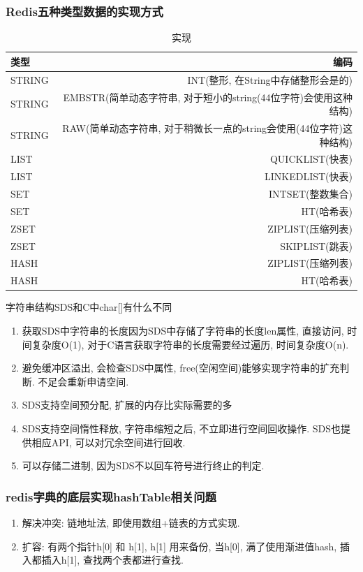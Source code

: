 \documentclass[UTF8]{ctexart}
\begin{document}
\subsubsection{Redis五种类型数据的实现方式}
\begin{table}[!htbp]
	\centering
	\caption{实现}
	\begin{tabular}{|l|r|}
		
		\hline
		类型&编码\\
		\hline
		STRING&INT(整形, 在String中存储整形会是的)\\
		\hline
		STRING&EMBSTR(简单动态字符串, 对于短小的string(44位字符)会使用这种结构)\\
		\hline
		STRING&RAW(简单动态字符串, 对于稍微长一点的string会使用(44位字符)这种结构)\\
		\hline
		LIST&QUICKLIST(快表)\\
		\hline
		LIST&LINKEDLIST(快表)\\
		\hline
		SET&INTSET(整数集合)\\
		\hline
		SET&HT(哈希表)\\
		\hline
		ZSET&ZIPLIST(压缩列表)\\
		\hline
		ZSET&SKIPLIST(跳表)\\
		\hline
		HASH&ZIPLIST(压缩列表)\\
		\hline
		HASH&HT(哈希表)\\
		\hline
	\end{tabular}
\end{table}
字符串结构SDS和C中char[]有什么不同
\begin{enumerate}
	\item 获取SDS中字符串的长度因为SDS中存储了字符串的长度len属性, 直接访问, 时间复杂度O(1), 对于C语言获取字符串的长度需要经过遍历, 时间复杂度O(n).
	\item 避免缓冲区溢出, 会检查SDS中属性, free(空闲空间)能够实现字符串的扩充判断. 不足会重新申请空间.
	\item SDS支持空间预分配, 扩展的内存比实际需要的多
	\item SDS支持空间惰性释放, 字符串缩短之后, 不立即进行空间回收操作. SDS也提供相应API, 可以对冗余空间进行回收.
	\item 可以存储二进制, 因为SDS不以回车符号进行终止的判定.
\end{enumerate}
\subsubsection{redis字典的底层实现hashTable相关问题}
\begin{enumerate}
	\item 解决冲突: 链地址法, 即使用数组+链表的方式实现. 
	\item 扩容: 有两个指针h[0] 和 h[1], h[1] 用来备份, 当h[0], 满了使用渐进值hash, 插入都插入h[1], 查找两个表都进行查找.
\end{enumerate}
\end{document}
